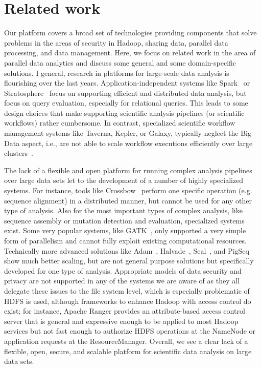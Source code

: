 \section{Related work}

Our platform covers a broad set of technologies providing components that solve problems in the areas of security in Hadoop, sharing data, parallel data processing, and data management. Here, we focus on related work in the area of parallel data analytics and discuss some general and some domain-specific solutions. I general, research in platforms for large-scale data analysis is flourishing over the last years. Application-independent systems like Spark~\cite{Zaharia2010} or Stratosphere~\cite{Alexandrov2014} focus on supporting efficient and distributed data analysis, but focus on query evaluation, especially for relational queries. This leads to some design choices that make supporting scientific analysis pipelines (or scientific workflows) rather cumbersome. %
In contrast, specialized scientific workflow management systems like Taverna, Kepler, or Galaxy, typically neglect the Big Data aspect, i.e., are not able to scale workflow executions efficiently over large clusters~\cite{Bux2013}. 

The lack of a flexible and open platform for running complex analysis pipelines over large data sets let to the development of a number of highly specialized systems. For instance, tools like Crossbow~\cite{Langmead2009b} perform one specific operation (e.g. sequence alignment) in a distributed manner, but cannot be used for any other type of analysis. Also for the most important types of complex analysis, like sequence assembly or mutation detection and evaluation, specialized systems exist. Some very popular systems, like GATK~\cite{McKenna2010}, only supported a very simple form of parallelism and cannot fully exploit existing computational resources. Technically more advanced solutions like Adam~\cite{adam15}, Halvade~\cite{halvade15}, Seal~\cite{seal11}, and PigSeq~\cite{seqpig14} show much better scaling, but are not general purpose solutions but specifically developed for one type of analysis. Appropriate models of data security and privacy are not supported in any of the systems we are aware of as they all delegate these issues to the file system level, which is especially problematic of HDFS is used, although frameworks to enhance Hadoop with access control do exist; for instance, Apache Ranger provides an attribute-based access control server that is general and expressive enough to be applied to most Hadoop services but not fast enough to authorize HDFS operations at the NameNode or application requests at the ResourceManager. Overall, we see a clear lack of a flexible, open, secure, and scalable platform for scientific data analysis on large data sets.
